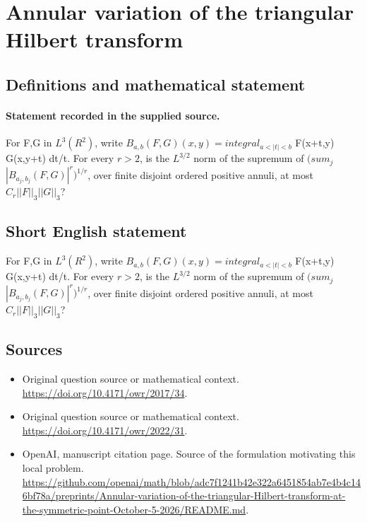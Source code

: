 \documentclass[11pt]{article}
\begin{document}
\section*{Annular variation of the triangular Hilbert transform}\label{statement}
\subsection{Definitions and mathematical statement}
\paragraph{Statement recorded in the supplied source.}
For F,G in $L^3(R^2)$, write $B_{a,b}(F,G)(x,y)=integral_{a<|t|<b}$ F(x+t,y) G(x,y+t) dt/t. For every $r>2$, is the $L^{3/2}$ norm of the supremum of $(sum_j$ $|B_{a_j,b_j}(F,G)|^r)^{1/r}$, over finite disjoint ordered positive annuli, at most $C_r||F||_3||G||_3$?
\subsection{Short English statement}
For F,G in $L^3(R^2)$, write $B_{a,b}(F,G)(x,y)=integral_{a<|t|<b}$ F(x+t,y) G(x,y+t) dt/t. For every $r>2$, is the $L^{3/2}$ norm of the supremum of $(sum_j$ $|B_{a_j,b_j}(F,G)|^r)^{1/r}$, over finite disjoint ordered positive annuli, at most $C_r||F||_3||G||_3$?
\subsection{Sources}
\begin{itemize}
\item[S1] Original question source or mathematical context.
\url{https://doi.org/10.4171/owr/2017/34}.
\item[S2] Original question source or mathematical context.
\url{https://doi.org/10.4171/owr/2022/31}.
\item[S3] OpenAI, manuscript citation page. Source of the formulation motivating this local problem.
\url{https://github.com/openai/math/blob/adc7f1241b42e322a6451854ab7e4b4c146bf78a/preprints/Annular-variation-of-the-triangular-Hilbert-transform-at-the-symmetric-point-October-5-2026/README.md}.
\end{itemize}
\end{document}
